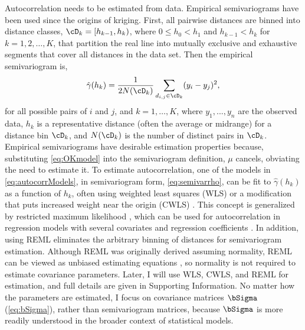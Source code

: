 Autocorrelation needs to be estimated from data. Empirical semivariograms have been used since the origins of kriging. First, all pairwise distances are binned into distance classes, $\cD_k = [h_{k-1},h_k)$, where $0 \le h_0 < h_1$ and $h_{k-1} < h_k$ for $k = 1, 2, \ldots, K$, that partition the real line into mutually exclusive and exhaustive segments that cover all distances in the data set.  Then the empirical semivariogram is,
\begin{equation} \label{eq:gammahat}
				\hat{\gamma}(h_k) = \frac{1}{2N(\cD_k)}\sum_{d_{i,j} \in \cD_k} (y_i - y_j)^2,
\end{equation}
for all possible pairs of $i$ and $j$, and $k = 1, \ldots, K$, where $y_1, . . . ,y_n$ are the observed data, $h_k$ is a representative distance (often the average or midrange) for a distance bin $\cD_k$, and $N(\cD_k)$ is the number of distinct pairs in $\cD_k$. Empirical semivariograms have desirable estimation properties \citep[it is an unbiased estimator,][p. 71]{Cres:stat:1993} because, substituting \ref{eq:OKmodel} into the semivariogram definition, $\mu$ cancels, obviating the need to estimate it.  To estimate autocorrelation, one of the models in \ref{eq:autocorrModels}, in semivariogram form, \ref{eq:semivarrho}, can be fit to $\hat{\gamma}(h_k)$ as a function of $h_k$, often using weighted least squares (WLS) or a modification that puts increased weight near the origin (CWLS) \citep{Cres:fitt:1985}.  This concept is generalized by restricted maximum likelihood \citep[REML, ][]{Patt:Thom:reco:1971, Patt:Thom:maxi:1974}, which can be used for autocorrelation in regression models with several covariates and regression coefficients \citep[for REML applied to spatial models, see, e.g.,][p. 93]{Cres:stat:1993}. In addition, using REML eliminates the arbitrary binning of distances for semivariogram estimation.  Although REML was originally derived assuming normality, REML can be viewed as unbiased estimating equations \citep{Heyd:quas:1994, Cres:Lahi:asym:1996}, so normality is not required to estimate covariance parameters.  Later, I will use WLS, CWLS, and REML for estimation, and full details are given in Supporting Information. No matter how the parameters are estimated, I focus on covariance matrices $\bSigma$ (\ref{eq:bSigma}), rather than semivariogram matrices, because $\bSigma$ is more readily understood in the broader context of statistical models.

